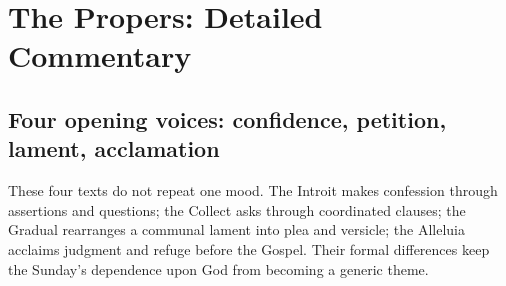 \section*{The Propers: Detailed Commentary}

\subsection*{Four opening voices: confidence, petition, lament, acclamation\enspace{}}

These four texts do not repeat one mood. The Introit makes confession through assertions and questions; the Collect asks through coordinated clauses; the Gradual rearranges a communal lament into plea and versicle; the Alleluia acclaims judgment and refuge before the Gospel. Their formal differences keep the Sunday's dependence upon God from becoming a generic theme.

